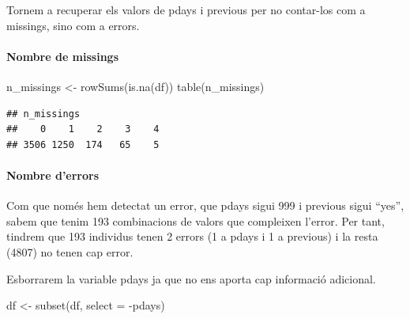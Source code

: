 \documentclass[
]{article}
\newenvironment{Shaded}{\begin{snugshade}}{\end{snugshade}}
\newcommand{\AttributeTok}[1]{\textcolor[rgb]{0.77,0.63,0.00}{#1}}
\newcommand{\DecValTok}[1]{\textcolor[rgb]{0.00,0.00,0.81}{#1}}
\newcommand{\FunctionTok}[1]{\textcolor[rgb]{0.00,0.00,0.00}{#1}}
\newcommand{\NormalTok}[1]{#1}
\newcommand{\OtherTok}[1]{\textcolor[rgb]{0.56,0.35,0.01}{#1}}
\newcommand{\SpecialCharTok}[1]{\textcolor[rgb]{0.00,0.00,0.00}{#1}}
\newcommand{\StringTok}[1]{\textcolor[rgb]{0.31,0.60,0.02}{#1}}
\begin{document}
Tornem a recuperar els valors de pdays i previous per no contar-los com
a missings, sino com a errors.

\begin{Shaded}
\end{Shaded}

\hypertarget{nombre-de-missings-1}{%
\paragraph{Nombre de missings}\label{nombre-de-missings-1}}

\begin{Shaded}
\begin{Highlighting}[]
\NormalTok{n\_missings }\OtherTok{\textless{}{-}} \FunctionTok{rowSums}\NormalTok{(}\FunctionTok{is.na}\NormalTok{(df))}
\FunctionTok{table}\NormalTok{(n\_missings)}
\end{Highlighting}
\end{Shaded}

\begin{verbatim}
## n_missings
##    0    1    2    3    4 
## 3506 1250  174   65    5
\end{verbatim}

\hypertarget{nombre-derrors-1}{%
\paragraph{Nombre d'errors}\label{nombre-derrors-1}}

Com que només hem detectat un error, que pdays sigui 999 i previous
sigui ``yes'', sabem que tenim 193 combinacions de valors que compleixen
l'error. Per tant, tindrem que 193 individus tenen 2 errors (1 a pdays i
1 a previous) i la resta (4807) no tenen cap error.

Esborrarem la variable pdays ja que no ens aporta cap informació
adicional.

\begin{Shaded}
\begin{Highlighting}[]
\NormalTok{df }\OtherTok{\textless{}{-}} \FunctionTok{subset}\NormalTok{(df, }\AttributeTok{select =} \SpecialCharTok{{-}}\NormalTok{pdays)}
\end{Highlighting}
\end{Shaded}
\end{document}
